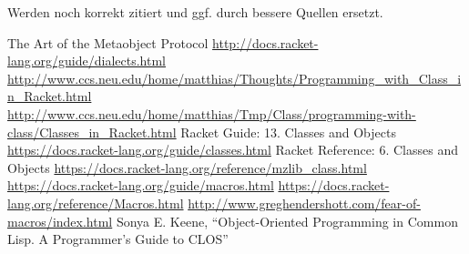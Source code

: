 Werden noch korrekt zitiert und ggf. durch bessere Quellen ersetzt. 
\begin{thebibliography}{}
  The Art of the Metaobject Protocol 
  \url{http://docs.racket-lang.org/guide/dialects.html}
  \url{http://www.ccs.neu.edu/home/matthias/Thoughts/Programming\_with\_Class\_in\_Racket.html}
  \url{http://www.ccs.neu.edu/home/matthias/Tmp/Class/programming-with-class/Classes\_in\_Racket.html}
  Racket Guide: 13. Classes and Objects \url{https://docs.racket-lang.org/guide/classes.html}
  Racket Reference: 6. Classes and Objects \url{https://docs.racket-lang.org/reference/mzlib\_class.html}
  \url{https://docs.racket-lang.org/guide/macros.html}
  \url{https://docs.racket-lang.org/reference/Macros.html}
  \url{http://www.greghendershott.com/fear-of-macros/index.html}
  Sonya E. Keene, ``Object-Oriented Programming in Common Lisp. A Programmer's Guide to CLOS''
\end{thebibliography}

\cleardoublepage